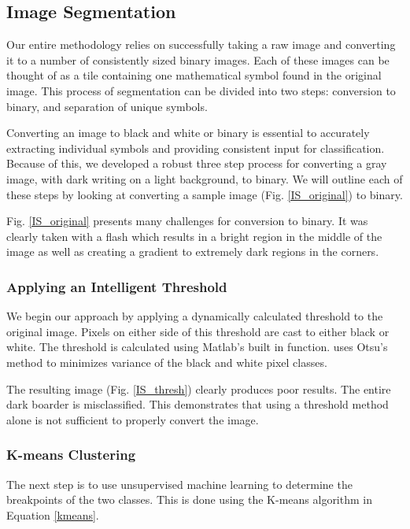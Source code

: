 \subsection{Image Segmentation}
Our entire methodology relies on successfully taking a raw image and converting it to a number of consistently sized binary images. Each of these images can be thought of as a tile containing one mathematical symbol found in the original image. This process of segmentation can be divided into two steps: conversion to binary, and separation of unique symbols.

Converting an image to black and white or binary is essential to accurately extracting individual symbols and providing consistent input for classification. Because of this, we developed a robust three step process for converting a gray image, with dark writing on a light background, to binary. We will outline each of these steps by looking at converting a sample image (Fig. \ref{IS_original}) to binary.


Fig. \ref{IS_original} presents many challenges for conversion to binary. It was clearly taken with a flash which results in a bright region in the middle of the image as well as creating a gradient to extremely dark regions in the corners. 

\subsubsection{Applying an Intelligent Threshold}
We begin our approach by applying a dynamically calculated threshold to the original image. Pixels on either side of this threshold are cast to either black or white. The threshold is calculated using Matlab's built in  function.  uses Otsu's method to minimizes variance of the black and white pixel classes.


The resulting image (Fig. \ref{IS_thresh}) clearly produces poor results. The entire dark boarder is misclassified. This demonstrates that using a threshold method alone is not sufficient to properly convert the image.

\subsubsection{K-means Clustering}
The next step is to use unsupervised machine learning to determine the breakpoints of the two classes. This is done using the K-means algorithm in Equation \ref{kmeans}.

